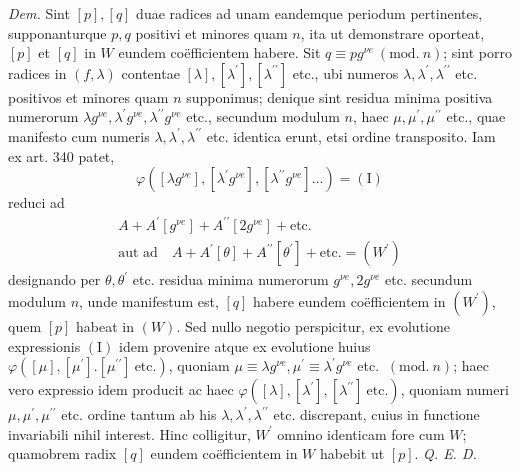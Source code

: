 \textit{Dem.} Sint \([p],\allowbreak [q]\) duae radices ad unam eandemque periodum pertinentes, supponanturque \(p,\allowbreak q\) positivi et minores quam \(n\), ita ut demonstrare oporteat, \([p]\) et \([q]\) in \(W\) eundem coëfficientem habere. Sit \(q\equiv pg^{\nu e}\ (\mathrm{mod.}\ n)\); sint porro radices in \((f,\allowbreak \lambda)\) contentae \([\lambda],\allowbreak [\lambda^{\prime}],\allowbreak [\lambda^{\prime\prime}]\) etc., ubi numeros \(\lambda,\allowbreak \lambda^{\prime},\allowbreak \lambda^{\prime\prime}\) etc. positivos et minores quam \(n\) supponimus; denique sint residua minima positiva numerorum \(\lambda g^{\nu e},\allowbreak \lambda^{\prime} g^{\nu e},\allowbreak \lambda^{\prime\prime} g^{\nu e}\) etc., secundum modulum \(n\), haec \(\mu,\allowbreak \mu^{\prime},\allowbreak \mu^{\prime\prime}\) etc., quae manifesto cum numeris \(\lambda,\allowbreak \lambda^{\prime},\allowbreak \lambda^{\prime\prime}\) etc. identica erunt, etsi ordine transposito. Iam ex art. 340 patet, \[\varphi([\lambda g^{\nu e}],[\lambda^{\prime} g^{\nu e}],[\lambda^{\prime\prime} g^{\nu e}]\ldots)=(\mathrm I)\] reduci ad \[\begin{gathered}
A+A^{\prime}[g^{\nu e}]+A^{\prime\prime}[2g^{\nu e}]+\mathrm{etc.}\\
\text{aut ad}\quad A+A^{\prime}[\theta]+A^{\prime\prime}[\theta^{\prime}]+\mathrm{etc.}=(W^{\prime})
\end{gathered}\] designando per \(\theta,\allowbreak \theta^{\prime}\) etc. residua minima numerorum \(g^{\nu e},\allowbreak 2g^{\nu e}\) etc. secundum modulum \(n\), unde manifestum est, \([q]\) habere eundem coëfficientem in \((W^{\prime})\), quem \([p]\) habeat in \((W)\). Sed nullo negotio perspicitur, ex evolutione expressionis \((\mathrm I)\) idem provenire atque ex evolutione huius \(\varphi([\mu],\allowbreak [\mu^{\prime}].[\mu^{\prime\prime}]\ \text{etc.})\), quoniam \(\mu\equiv\lambda g^{\nu e},\allowbreak \mu^{\prime}\equiv\lambda^{\prime} g^{\nu e}\) etc. \(\ (\mathrm{mod.}\ n)\); haec vero expressio idem producit ac haec \(\varphi([\lambda],\allowbreak [\lambda^{\prime}],\allowbreak [\lambda^{\prime\prime}]\ \text{etc.})\), quoniam numeri \(\mu,\allowbreak \mu^{\prime},\allowbreak \mu^{\prime\prime}\) etc. ordine tantum ab his \(\lambda,\allowbreak \lambda^{\prime},\allowbreak \lambda^{\prime\prime}\) etc. discrepant, cuius in functione invariabili nihil interest. Hinc colligitur, \(W^{\prime}\) omnino identicam fore cum \(W\); quamobrem radix \([q]\) eundem coëfficientem in \(W\) habebit ut \([p]\). \textit{Q. E. D.}

